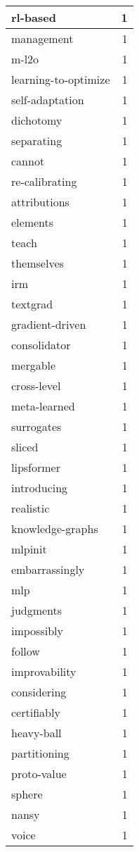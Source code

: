 \begin{table}[h]
\begin{tabular}{|l|r|}
\hline
rl-based & 1 \\
\hline
management & 1 \\
\hline
m-l2o & 1 \\
\hline
learning-to-optimize & 1 \\
\hline
self-adaptation & 1 \\
\hline
dichotomy & 1 \\
\hline
separating & 1 \\
\hline
cannot & 1 \\
\hline
re-calibrating & 1 \\
\hline
attributions & 1 \\
\hline
elements & 1 \\
\hline
teach & 1 \\
\hline
themselves & 1 \\
\hline
irm & 1 \\
\hline
textgrad & 1 \\
\hline
gradient-driven & 1 \\
\hline
consolidator & 1 \\
\hline
mergable & 1 \\
\hline
cross-level & 1 \\
\hline
meta-learned & 1 \\
\hline
surrogates & 1 \\
\hline
sliced & 1 \\
\hline
lipsformer & 1 \\
\hline
introducing & 1 \\
\hline
realistic & 1 \\
\hline
knowledge-graphs & 1 \\
\hline
mlpinit & 1 \\
\hline
embarrassingly & 1 \\
\hline
mlp & 1 \\
\hline
judgments & 1 \\
\hline
impossibly & 1 \\
\hline
follow & 1 \\
\hline
improvability & 1 \\
\hline
considering & 1 \\
\hline
certifiably & 1 \\
\hline
heavy-ball & 1 \\
\hline
partitioning & 1 \\
\hline
proto-value & 1 \\
\hline
sphere & 1 \\
\hline
nansy & 1 \\
\hline
voice & 1 \\

\end{tabular}
\end{table}
